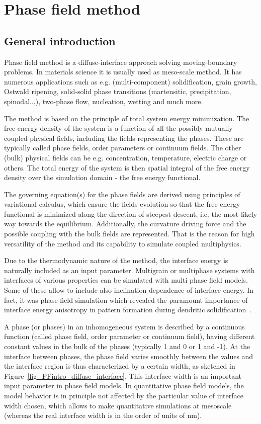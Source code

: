 \chapter{Phase field method} \label{ch_introPF}

\section{General introduction}
Phase field method is a diffuse-interface approach solving moving-boundary problems. In materials science it is usually used as meso-scale method. It has numerous applications such as e.g. (multi-component) solidification, grain growth, Ostwald ripening, solid-solid phase transitions (martensitic, precipitation, spinodal...), two-phase flow, nucleation, wetting and much more. 

The method is based on the principle of total system energy minimization. The free energy density of the system is a function of all the possibly mutually coupled physical fields, including the fields representing the phases. These are typically called phase fields, order parameters or continuum fields. The other (bulk) physical fields can be e.g. concentration, temperature, electric charge or others. The total energy of the system is then spatial integral of the free energy density over the simulation domain - the free energy functional.

The governing equation(s) for the phase fields are derived using principles of variational calculus, which ensure the fields evolution so that the free energy functional is minimized along the direction of steepest descent, i.e. the most likely way towards the equilibrium. Additionally, the curvature driving force and the possible coupling with the bulk fields are represented. That is the reason for high versatility of the method and its capability to simulate coupled multiphysics. 

Due to the thermodynamic nature of the method, the interface energy is naturally included as an input parameter. Multigrain or multiphase systems with interfaces of various properties can be simulated with multi phase field models. Some of these allow to include also inclination dependence of interface energy. In fact, it was phase field simulation which revealed the paramount importance of interface energy anisotropy in pattern formation during dendritic solidification~\cite{Kobayashi1993}.

A phase (or phases) in an inhomogeneous system is described by a continuous function (called phase field, order parameter or continuum field), having different constant values in the bulk of the phases (typically 1 and 0 or 1 and -1). At the interface between phases, the phase field varies smoothly between the values and the interface region is thus characterized by a certain width, as sketched in Figure~\ref{fig_PFintro_diffuse_interface}. This interface width is an important input parameter in phase field models. In quantitative phase field models, the model behavior is in principle not affected by the particular value of interface width chosen, which allows to make quantitative simulations at mesoscale (whereas the real interface width is in the order of units of nm).

